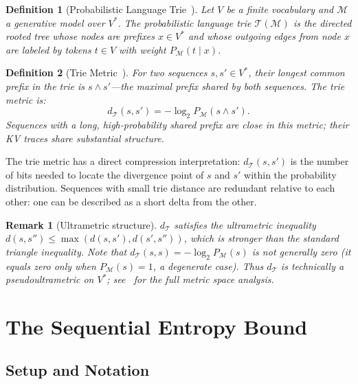 \documentclass[11pt]{article}
\newtheorem{definition}{Definition}
\newtheorem{remark}{Remark}
\begin{document}
\begin{definition}[Probabilistic Language Trie~\cite{plt2026}]
Let $V$ be a finite vocabulary and $\mathcal{M}$ a generative model over $V^*$.
The \emph{probabilistic language trie} $\mathcal{T}(\mathcal{M})$ is the directed
rooted tree whose nodes are prefixes $x \in V^*$ and whose outgoing edges from
node $x$ are labeled by tokens $t \in V$ with weight $P_{\mathcal{M}}(t \mid x)$.
\end{definition}

\begin{definition}[Trie Metric~\cite{plt2026}]
\label{def:trie_metric}
For two sequences $s, s' \in V^*$, their \emph{longest common prefix} in the
trie is $s \wedge s'$---the maximal prefix shared by both sequences.  The
\emph{trie metric} is:
\[
  d_{\mathcal{T}}(s, s') = -\log_2 P_{\mathcal{M}}(s \wedge s').
\]
Sequences with a long, high-probability shared prefix are close in this metric;
their KV traces share substantial structure.
\end{definition}

The trie metric has a direct compression interpretation: $d_{\mathcal{T}}(s, s')$
is the number of bits needed to locate the divergence point of $s$ and $s'$
within the probability distribution.  Sequences with small trie distance are
redundant relative to each other: one can be described as a short delta from the
other.

\begin{remark}[Ultrametric structure]
$d_{\mathcal{T}}$ satisfies the \emph{ultrametric} inequality
$d(s,s'') \leq \max(d(s,s'), d(s',s''))$, which is stronger than the
standard triangle inequality.  Note that $d_{\mathcal{T}}(s,s) = -\log_2 P_{\mathcal{M}}(s)$
is not generally zero (it equals zero only when $P_{\mathcal{M}}(s)=1$, a
degenerate case).  Thus $d_{\mathcal{T}}$ is technically a pseudoultrametric on $V^*$;
see~\cite{plt2026} for the full metric space analysis.
\end{remark}

\section{The Sequential Entropy Bound}
\label{sec:seq_entropy}

\subsection{Setup and Notation}
\end{document}
